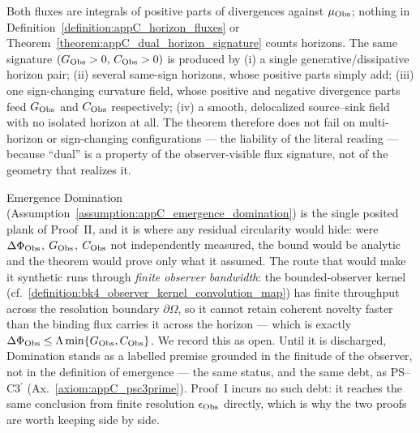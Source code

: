 \begin{remark}
\label{remark:appC_horizon_realizations}
Both fluxes are integrals of positive parts of divergences against \(\mu_{\mathrm{Obs}}\);
nothing in Definition~\ref{definition:appC_horizon_fluxes} or
Theorem~\ref{theorem:appC_dual_horizon_signature} counts horizons. The same
signature \((G_{\mathrm{Obs}}>0,\,C_{\mathrm{Obs}}>0)\) is produced by (i) a single
generative/dissipative horizon pair; (ii) several same-sign horizons, whose positive
parts simply add; (iii) one sign-changing curvature field, whose positive and
negative divergence parts feed \(G_{\mathrm{Obs}}\) and \(C_{\mathrm{Obs}}\) respectively; (iv) a
smooth, delocalized source--sink field with no isolated horizon at all. The theorem
therefore does not fail on multi-horizon or sign-changing configurations --- the
liability of the literal reading --- because ``dual'' is a property of the
observer-visible flux signature, not of the geometry that realizes it.
\end{remark}

\begin{remark}
\label{remark:appC_domination_open_route}
Emergence Domination (Assumption~\ref{assumption:appC_emergence_domination}) is the
single posited plank of Proof~II, and it is where any residual circularity would
hide: were \(\Delta\Phi_{\mathrm{Obs}}\), \(G_{\mathrm{Obs}}\), \(C_{\mathrm{Obs}}\) not independently
measured, the bound would be analytic and the theorem would prove only what it
assumed. The route that would make it synthetic runs through \emph{finite observer
bandwidth}: the bounded-observer kernel
(cf.~\ref{definition:bk4_observer_kernel_convolution_map}) has finite throughput
across the resolution boundary \(\partial\Omega\), so it cannot retain coherent
novelty faster than the binding flux carries it across the horizon --- which is exactly
\(\Delta\Phi_{\mathrm{Obs}}\le\Lambda\min\{G_{\mathrm{Obs}},C_{\mathrm{Obs}}\}\). We record this as open.
Until it is discharged, Domination stands as a labelled premise grounded in the
finitude of the observer, not in the definition of emergence --- the same status, and
the same debt, as PS--C3\(^\prime\) (Ax.~\ref{axiom:appC_psc3prime}). Proof~I incurs no
such debt: it reaches the same conclusion from finite resolution \(\epsilon_{\mathrm{Obs}}\)
directly, which is why the two proofs are worth keeping side by side.
\end{remark}

